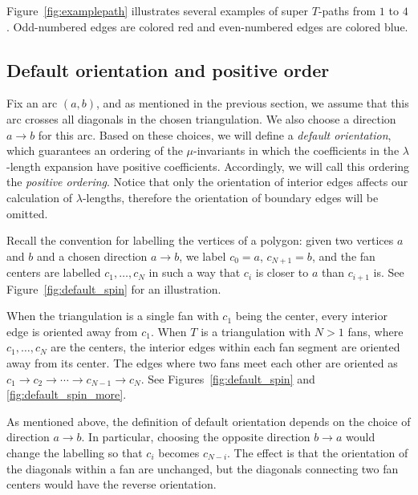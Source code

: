\begin{Example} \label{example:14some}\rm
 Figure~\ref{fig:examplepath} illustrates several examples of super $T$-paths from $1$ to $4$.
 Odd-numbered edges are colored red and even-numbered edges are colored blue.


\end{Example}

\subsection{Default orientation and positive order}	

{Fix an arc $(a,b)$, and as mentioned in the previous section, we assume that this arc crosses all diagonals in the chosen triangulation.
We also choose a direction $a \to b$ for this arc.}
Based on these choices, we will define a \emph{default orientation}, which guarantees an ordering of the $\mu$-invariants
in which the coefficients in the $\lambda$-length expansion have positive coefficients.
Accordingly, we will call this ordering the \emph{positive ordering}.
Notice that only the orientation of interior edges affects our calculation of $\lambda$-lengths, therefore the orientation of boundary edges will be omitted.

Recall the convention for labelling the vertices of a polygon: given two vertices $a$ and $b$ and a chosen
direction $a \to b$, we label $c_0 = a$, $c_{N+1} = b$, and the fan centers are labelled $c_1,\dots,c_N$ in such a way that $c_i$
is closer to $a$ than $c_{i+1}$ is. See Figure~\ref{fig:default_spin} for an illustration.

\begin{Definition}\rm
 When the triangulation is a single fan with $c_1$ being the center, every interior edge is oriented away from $c_1$.
 When $T$ is a triangulation with $N>1$ fans, where $c_1,\dots,c_N$ are the centers, the interior edges within each fan segment are oriented away
 from its center. The edges where two fans meet each other are oriented as
 \( c_1\rightarrow c_2\rightarrow\cdots\rightarrow c_{N-1}\rightarrow c_N \).
 See Figures~\ref{fig:default_spin} and \ref{fig:default_spin_more}.
\end{Definition}




\begin{Remark}\rm
 As mentioned above, the definition of default orientation depends on the choice of direction $a \to b$.
 In particular, choosing the opposite direction $b \to a$ would change the labelling so that $c_i$ becomes $c_{N-i}$.
 The effect is that the orientation of the diagonals within a fan are unchanged, but the diagonals connecting
 two fan centers would have the reverse orientation.
\end{Remark}

